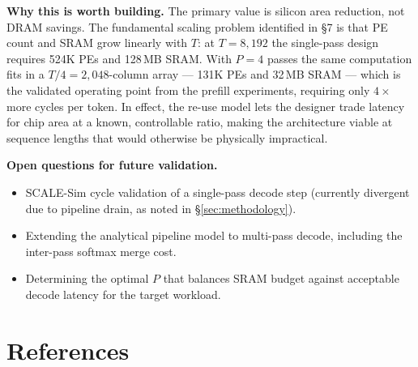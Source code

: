 \documentclass[11pt]{article}
\begin{document}
\textbf{Why this is worth building.}
The primary value is silicon area reduction, not DRAM savings.
The fundamental scaling problem identified in \S7 is that
PE count and SRAM grow linearly with \(T\): at \(T = 8{,}192\)
the single-pass design requires 524K PEs and 128\,MB SRAM.
With \(P = 4\) passes the same computation fits in a
\(T/4 = 2{,}048\)-column array --- 131K PEs and 32\,MB SRAM
--- which is the validated operating point from the prefill
experiments, requiring only \(4\times\) more cycles per token.
In effect, the re-use model lets the designer trade latency
for chip area at a known, controllable ratio, making the
architecture viable at sequence lengths that would otherwise
be physically impractical.

\textbf{Open questions for future validation.}
\begin{itemize}[noitemsep]
    \item SCALE-Sim cycle validation of a single-pass decode step
          (currently divergent due to pipeline drain, as noted in \S\ref{sec:methodology}).
    \item Extending the analytical pipeline model to multi-pass decode,
          including the inter-pass softmax merge cost.
    \item Determining the optimal \(P\) that balances SRAM budget
          against acceptable decode latency for the target workload.
\end{itemize}

\section{References}

\printbibliography[heading=none]
\end{document}
